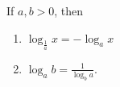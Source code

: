 \begin{frame}

\begin{proposition}
If $a, b > 0$, then
\begin{enumerate}
\item  $\log_{\frac{1}{a}}x=-\log_a x$
\item  $\log_{a}b=\frac{1}{\log_b a}$.
\end{enumerate}
\end{proposition}



\end{frame}